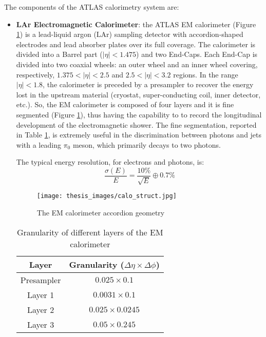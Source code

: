 \documentclass[a4paper, oneside, 11pt, openright]{book}
\begin{document}
				The components of the ATLAS calorimetry system are:
				\begin{itemize}
					\item \textbf{LAr Electromagnetic Calorimeter}: the ATLAS EM calorimeter \cite{LArCalo_report} (Figure \ref{fig:calo struct}) is a lead-liquid argon (LAr) sampling detector with accordion-shaped electrodes and lead absorber plates over its full coverage. The calorimeter is divided into a Barrel part ($|\eta|<1.475$) and two End-Caps. Each End-Cap is divided into two coaxial wheels: an outer wheel and an inner wheel covering, respectively, $1.375<|\eta|<2.5$ and $2.5<|\eta|<3.2$ regions. 
					In the range $|\eta|<1.8$, the calorimeter is preceded by a presampler to recover the energy lost in the upstream material (cryostat, super-conducting coil, inner detector, etc.). So, the EM calorimeter is composed of four layers and it is fine segmented (Figure \ref{fig:calo struct}), thus having the capability to to record the longitudinal development of the electromagnetic shower. The fine segmentation, reported in Table \ref{tab:LAr_sample}, is extremely useful in the discrimination between photons and jets with a leading $\pi_0$ meson, which primarily decays to two photons.
					
					The typical energy resolution, for electrons and photons, is:
					$$ 
					\frac{\sigma(E)}{E} = \frac{10\%}{\sqrt{E}} \oplus 0.7\%
					$$
					
					\begin{figure}
						\centering
						\texttt{[image: thesis\_images/calo\_struct.jpg]}
						\caption{The EM calorimeter accordion geometry}
						\label{fig:calo struct}
					\end{figure}
					\begin{table}
						\centering
						\begin{tabular}{cc}
							\toprule[1.5pt]
							\textbf{Layer} & \textbf{Granularity ($\Delta\eta \times \Delta\phi$)} \\
							\midrule
							Presampler & $0.025 \times 0.1$ \\
							Layer 1 & $0.0031 \times 0.1$ \\
							Layer 2 & $0.025 \times 0.0245$ \\
							Layer 3 & $0.05 \times 0.245$ \\
							\bottomrule[1.5pt]
						\end{tabular}
						\caption{Granularity of different layers of the EM calorimeter}\label{tab:granularity}
						\label{tab:LAr_sample}
					\end{table}


\end{itemize}
\end{document}
